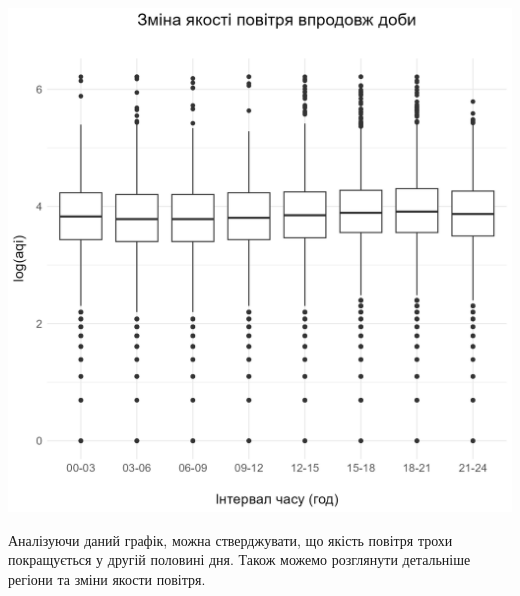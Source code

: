 \documentclass{article}
\begin{document}
\begin{enumerate}
    \begin{center}
    \includegraphics[width=6in]{plots/question3/box.png}
    \end{center}
    Аналізуючи даний графік, можна стверджувати, що якість повітря трохи покращується у другій половині дня.
    Також можемо розглянути детальніше регіони та зміни якости повітря. 
    

\end{enumerate}
\end{document}
